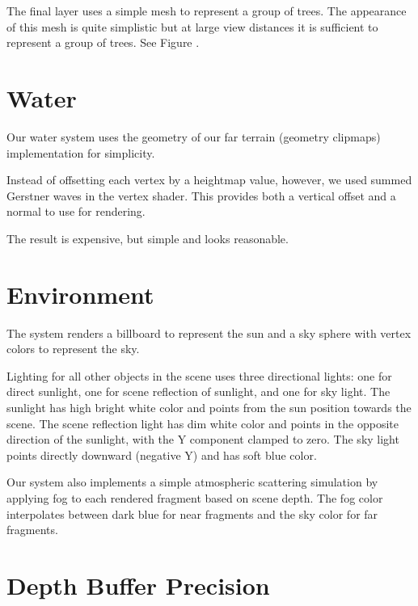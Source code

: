 The final layer uses a simple mesh to represent a group of trees.
The appearance of this mesh is quite simplistic but at large view distances it is sufficient to represent a group of trees.
See Figure .

\section{Water} \label{sec:water} %


Our water system uses the geometry of our far terrain (geometry clipmaps) implementation for simplicity.

Instead of offsetting each vertex by a heightmap value, however, we used summed Gerstner waves in the vertex shader.
This provides both a vertical offset and a normal to use for rendering.

The result is expensive, but simple and looks reasonable.


\section{Environment} \label{sec:env} %

The system renders a billboard to represent the sun and a sky sphere with vertex colors to represent the sky.

Lighting for all other objects in the scene uses three directional lights: one for direct sunlight, one for scene reflection of sunlight, and one for sky light.
The sunlight has high bright white color and points from the sun position towards the scene.
The scene reflection light has dim white color and points in the opposite direction of the sunlight, with the Y component clamped to zero.
The sky light points directly downward (negative Y) and has soft blue color.

Our system also implements a simple atmospheric scattering simulation by applying fog to each rendered fragment based on scene depth.
The fog color interpolates between dark blue for near fragments and the sky color for far fragments.


\section{Depth Buffer Precision} \label{sec:prec} %

